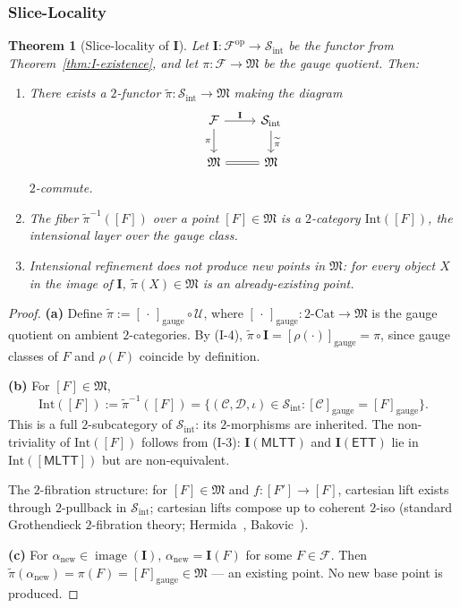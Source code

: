 \documentclass[11pt]{article}
\theoremstyle{plain}
\newtheorem{theorem}{Theorem}[section]
\theoremstyle{definition}
\newcommand{\cS}{\mathcal{S}}
\newcommand{\cF}{\mathcal{F}}
\newcommand{\cC}{\mathcal{C}}
\newcommand{\cD}{\mathcal{D}}
\newcommand{\fM}{\mathfrak{M}}
\newcommand{\Sint}{\cS_{\mathrm{int}}}
\newcommand{\Cat}{\mathrm{Cat}}
\newcommand{\MLTT}{\mathsf{MLTT}}
\newcommand{\ETT}{\mathsf{ETT}}
\newcommand{\II}{\mathbf{I}}
\newcommand{\cU}{\mathcal{U}}
\newcommand{\tpi}{\widetilde{\pi}}
\DeclareMathOperator{\image}{image}
\begin{document}
\subsubsection{Slice-Locality}

\begin{theorem}[Slice-locality of $\II$]\label{thm:slice-locality}
Let $\II : \cF^{\mathrm{op}} \to \Sint$ be the functor from Theorem~\ref{thm:I-existence}, and let $\pi : \cF \to \fM$ be the gauge quotient. Then:
\begin{enumerate}
\item[\textbf{(a)}] There exists a $2$-functor $\tpi : \Sint \to \fM$ making the diagram
\[
\begin{tikzcd}
\cF \arrow[r, "\II"] \arrow[d, "\pi"'] & \Sint \arrow[d, "\tpi"] \\
\fM \arrow[r, equal] & \fM
\end{tikzcd}
\]
$2$-commute.
\item[\textbf{(b)}] The fiber $\tpi^{-1}([F])$ over a point $[F] \in \fM$ is a $2$-category $\mathrm{Int}([F])$, the \emph{intensional layer over the gauge class}.
\item[\textbf{(c)}] Intensional refinement does not produce new points in $\fM$: for every object $X$ in the image of $\II$, $\tpi(X) \in \fM$ is an already-existing point.
\end{enumerate}
\end{theorem}

\begin{proof}

\textbf{(a)} Define $\tpi := [\, \cdot \,]_{\mathrm{gauge}} \circ \cU$, where $[\, \cdot \,]_{\mathrm{gauge}} : 2\text{-}\Cat \to \fM$ is the gauge quotient on ambient $2$-categories. By (I-4), $\tpi \circ \II = [\rho(\cdot)]_{\mathrm{gauge}} = \pi$, since gauge classes of $F$ and $\rho(F)$ coincide by definition.

\textbf{(b)} For $[F] \in \fM$,
\[ \mathrm{Int}([F]) := \tpi^{-1}([F]) = \{(\cC, \cD, \iota) \in \Sint : [\cC]_{\mathrm{gauge}} = [F]_{\mathrm{gauge}}\}. \]
This is a full $2$-subcategory of $\Sint$: its $2$-morphisms are inherited. The non-triviality of $\mathrm{Int}([F])$ follows from (I-3): $\II(\MLTT)$ and $\II(\ETT)$ lie in $\mathrm{Int}([\MLTT])$ but are non-equivalent.

The $2$-fibration structure: for $[F] \in \fM$ and $f : [F'] \to [F]$, cartesian lift exists through $2$-pullback in $\Sint$; cartesian lifts compose up to coherent $2$-iso (standard Grothendieck $2$-fibration theory; Hermida~\cite{Hermida1999}, Bakovic~\cite{Bakovic2010}).

\textbf{(c)} For $\alpha_{\mathrm{new}} \in \image(\II)$, $\alpha_{\mathrm{new}} = \II(F)$ for some $F \in \cF$. Then $\tpi(\alpha_{\mathrm{new}}) = \pi(F) = [F]_{\mathrm{gauge}} \in \fM$ --- an existing point. No new base point is produced.
\end{proof}
\end{document}
